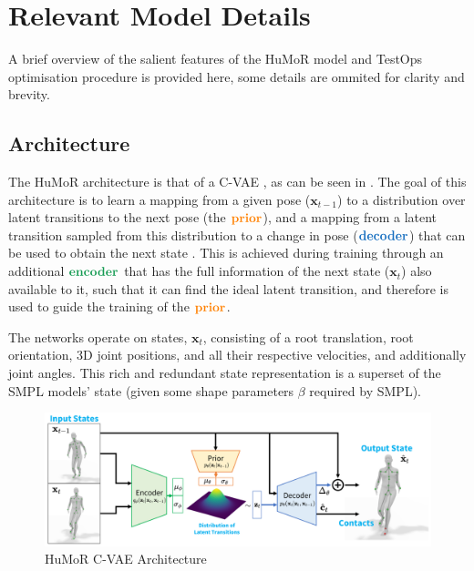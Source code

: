 \section{Relevant Model Details}

A brief overview of the salient features of the HuMoR model and TestOps optimisation procedure is provided here, some details are ommited for clarity and brevity.

\subsection{Architecture}
The HuMoR architecture is that of a C-VAE \cite{CVAE}, as can be seen in . The goal of this architecture is to learn a mapping from a given pose ($\mathbf{x}_{t-1}$) to a distribution over latent transitions to the next pose (the $\textbf{\textcolor{orange}{prior}}$), and a mapping from a latent transition sampled from this distribution to a change in pose ($\textbf{\textcolor{RoyalBlue}{decoder}}$) that can be used to obtain the next state . This is achieved during training through an additional $\textbf{\textcolor{ForestGreen}{encoder}}$ that has the full information of the next state ($\textbf{x}_t$) also available to it, such that it can find the ideal latent transition, and therefore is used to guide the training of the $\textbf{\textcolor{orange}{prior}}$.

The networks operate on states, $\mathbf{x}_t$, consisting of a root translation, root orientation, 3D joint positions, and all their respective velocities, and additionally joint angles. This rich and redundant state representation is a superset of the SMPL models' state \cite{SMPL} (given some shape parameters $\beta$ required by SMPL).

\begin{figure}[!ht]
    \centering
    \includegraphics[width=1\textwidth]{Figures/humor/model/architecture.png}
    \caption{HuMoR C-VAE Architecture \cite{humor}}
    \label{fig:humor_architecture}
\end{figure}


